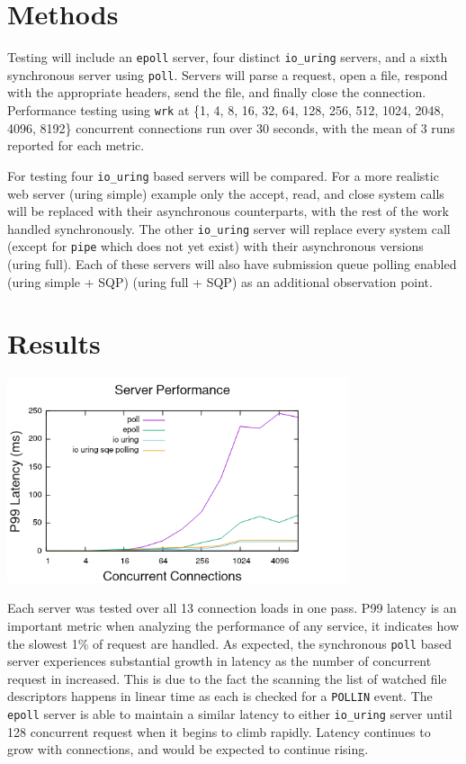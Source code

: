\documentclass[letterpaper, 10pt, twocolumn]{article}
\begin{document}
\section{Methods}
\label{sec:org4d8a31f}
Testing will include an \texttt{epoll} server, four distinct \texttt{io\_uring} servers, and a sixth synchronous server using \texttt{poll}. Servers will parse a request, open a file, respond with the appropriate headers, send the file, and finally close the connection. Performance testing using \texttt{wrk} at \{1, 4, 8, 16, 32, 64, 128, 256, 512, 1024, 2048, 4096, 8192\} concurrent connections run over 30 seconds, with the mean of 3 runs reported for each metric.

For testing four \texttt{io\_uring} based servers will be compared. For a more realistic web server (uring simple) example only the accept, read, and close system calls will be replaced with their asynchronous counterparts, with the rest of the work handled synchronously. The other \texttt{io\_uring} server will replace every system call (except for \texttt{pipe} which does not yet exist) with their asynchronous versions (uring full). Each of these servers will also have submission queue polling enabled (uring simple + SQP) (uring full + SQP) as an additional observation point.

\section{Results}
\label{sec:org2d075e0}
\begin{center}
\includegraphics[width=10cm]{./p99_latency.png}
\end{center}

Each server was tested over all 13 connection loads in one pass. P99 latency is an important metric when analyzing the performance of any service, it indicates how the slowest 1\% of request are handled. As expected, the synchronous \texttt{poll} based server experiences substantial growth in latency as the number of concurrent request in increased. This is due to the fact the scanning the list of watched file descriptors happens in linear time as each is checked for a \texttt{POLLIN} event. The \texttt{epoll} server is able to maintain a similar latency to either \texttt{io\_uring} server until 128 concurrent request when it begins to climb rapidly. Latency continues to grow with connections, and would be expected to continue rising.
\end{document}
